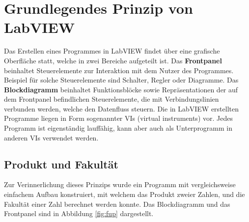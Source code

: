 \section{Grundlegendes Prinzip von LabVIEW}

Das Erstellen eines Programmes in LabVIEW findet über eine grafische Oberfläche statt, welche in zwei Bereiche aufgeteilt ist.
Das \textbf{Frontpanel} beinhaltet Steuerelemente zur Interaktion mit dem Nutzer des Programmes. Beispiel für solche Steuerelemente sind Schalter, Regler oder Diagramme. Das \textbf{Blockdiagramm} beinhaltet Funktionsblöcke sowie Repräsentationen der auf dem Frontpanel befindlichen Steuerelemente, die mit Verbindungslinien verbunden werden, welche den Datenfluss steuern.
Die in LabVIEW erstellten Programme liegen in Form sogenannter VIs (virtual instruments) vor. Jedes Programm ist eigenständig lauffähig, kann aber auch als Unterprogramm in anderen VIs verwendet werden.

\subsection{Produkt und Fakultät}

Zur Verinnerlichung dieses Prinzips wurde ein Programm mit vergleichsweise einfachem Aufbau konstruiert, mit welchem das Produkt zweier Zahlen, und die Fakultät einer Zahl berechnet werden konnte. Das Blockdiagramm und das Frontpanel sind in Abbildung \ref{fig:fup} dargestellt.

\

